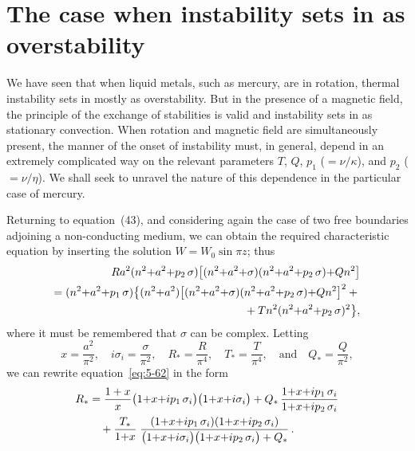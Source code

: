
\section{The case when instability sets in as overstability}\label{sec:53}

We have seen that when liquid metals, such as mercury, are in rotation,
thermal instability sets in mostly as overstability. But in the presence of
a magnetic field, the principle of the exchange of stabilities is valid and
instability sets in as stationary convection. When rotation and magnetic
field are simultaneously present, the manner of the onset of instability
must, in general, depend in an extremely complicated way on the
relevant parameters $T$, $Q$, $p_1$ ($= \nu/\kappa$), and $p_2$ ($= \nu/\eta$). We shall seek
to unravel the nature of this dependence in the particular case of mercury.

Returning to equation~(43), and considering again the case of two free
boundaries adjoining a non-conducting medium, we can obtain the
required characteristic equation by inserting the solution $W = W_0 \sin \pi z$;
thus
\begin{align}
Ra^2(n^2{+}a^2{+}p_2\,\sigma)\bigl[(n^2{+}a^2{+}\sigma)(n^2{+}a^2{+}p_2\,\sigma){+}Qn^2\bigr]
\notag\\
= (n^2{+}a^2{+}p_1\,\sigma)\bigl\{(n^2{+}a^2)\bigl[(n^2{+}a^2{+}\sigma)(n^2{+}a^2{+}p_2\,\sigma){+}Qn^2\bigr]^2 +{} \notag\\
\qquad {}+ Tn^2(n^2{+}a^2{+}p_2\,\sigma)^2\bigr\},
\label{eq:5-62}
\end{align}
where it must be remembered that $\sigma$ can be complex. Letting
\begin{equation}
x = \frac{a^2}{\pi^2},\quad
i\sigma_i = \frac{\sigma}{\pi^2},\quad
R_* = \frac{R}{\pi^4},\quad
T_* = \frac{T}{\pi^4},\quad\text{and}\quad
Q_* = \frac{Q}{\pi^2},
\label{eq:5-63}
\end{equation}
we can rewrite equation~\eqref{eq:5-62} in the form
\begin{align}
R_* &= \frac{1+x}{x}\bigl(1{+}x{+}ip_1\,\sigma_i\bigr)\bigl(1{+}x{+}i\sigma_i\bigr)
+ Q_*\,\frac{1{+}x{+}ip_1\,\sigma_i}{1{+}x{+}ip_2\,\sigma_i}
\notag\\
&\quad{}+ \frac{T_*}{1{+}x}\;\frac{(1{+}x{+}ip_1\,\sigma_i)(1{+}x{+}ip_2\,\sigma_i)}
{\bigl(1{+}x{+}i\sigma_i\bigr)\bigl(1{+}x{+}ip_2\,\sigma_i\bigr)+Q_*}\,.
\label{eq:5-64}
\end{align}

